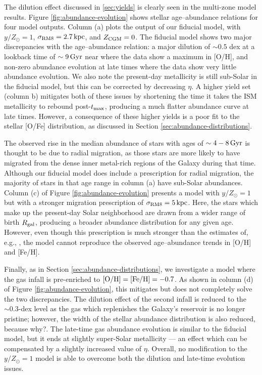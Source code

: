 \documentclass[twocolumn,twocolappendix,linenumbers]{aastex631}
\newcommand{\todo}[1]{{\color{red}#1}}
\begin{document}
The dilution effect discussed in \ref{sec:yields} is clearly seen in the multi-zone model results. Figure \ref{fig:abundance-evolution} shows stellar age--abundance relations for four model outputs. Column (a) plots the output of our fiducial model, with $y/Z_\odot=1$, $\sigma_{\rm RM8}=2.7\,{\rm kpc}$, and $Z_{\rm CGM}=0$. The fiducial model shows two major discrepancies with the \citet{leung_variational_2023} age--abundance relation: a major dilution of $\sim0.5$ dex at a lookback time of $\sim9\,{\rm Gyr}$ near where the data show a maximum in [O/H], and non-zero abundance evolution at late times where the data show very little abundance evolution. We also note the present-day metallicity is still sub-Solar in the fiducial model, but this can be corrected by decreasing $\eta$. A higher yield set (column b) mitigates both of these issues by shortening the time it takes the ISM metallicity to rebound post-$t_{\rm max}$, producing a much flatter abundance curve at late times. However, a consequence of these higher yields is a poor fit to the stellar [O/Fe] distribution, as discussed in Section \ref{sec:abundance-distributions}.

The observed rise in the median abundance of stars with ages of $\sim4-8\,{\rm Gyr}$ is thought to be due to radial migration, as those stars are more likely to have migrated from the dense inner metal-rich regions of the Galaxy during that time. Although our fiducial model does include a prescription for radial migration, the majority of stars in that age range in column (a) have sub-Solar abundances. Column (c) of Figure \ref{fig:abundance-evolution} presents a model with $y/Z_\odot=1$ but with a stronger migration prescription of $\sigma_{\rm RM8}=5\,{\rm kpc}$. Here, the stars which make up the present-day Solar neighborhood are drawn from a wider range of birth $R_{\rm gal}$, producing a broader abundance distribution for any given age. However, even though this prescription is much stronger than the estimates of, e.g., \citet{frankel_measuring_2018}, the model cannot reproduce the observed age--abundance trends in [O/H] and [Fe/H].

Finally, as in Section \ref{sec:abundance-distributions}, we investigate a model where the gas infall is pre-enriched to ${\rm [O/H]}={\rm [Fe/H]}=-0.7$. As shown in column (d) of Figure \ref{fig:abundance-evolution}, this mitigates but does not completely solve the two discrepancies. The dilution effect of the second infall is reduced to the $\sim0.3$-dex level as the gas which replenishes the Galaxy's reservoir is no longer pristine; however, the width of the stellar abundance distribution is also reduced, \todo{because why?}. The late-time gas abundance evolution is similar to the fiducial model, but it ends at slightly super-Solar metallicity --- an effect which can be compensated by a slightly increased value of $\eta$. Overall, no modification to the $y/Z_\odot=1$ model is able to overcome both the dilution and late-time evolution issues.
\end{document}
